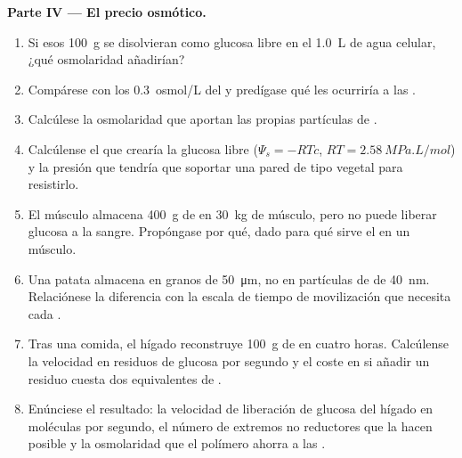 \begin{problem}
\medskip
\noindent\textbf{Parte IV --- El precio osmótico.}
\begin{enumerate}[resume]
  \item Si esos \qty{100}{g} se disolvieran como glucosa libre en el
        \qty{1.0}{L} de agua celular, ¿qué osmolaridad añadirían?
  \item Compárese con los \qty{0.3}{osmol/L} del  y predígase qué
        les ocurriría a las .
  \item Calcúlese la osmolaridad que aportan las propias partículas de
        .
  \item Calcúlense el  que crearía la glucosa libre
        ($\Psi_s = -RTc$, $RT = \qty{2.58}{MPa.L/mol}$) y la presión que
        tendría que soportar una pared de tipo vegetal para resistirlo.
  \item El músculo almacena \qty{400}{g} de  en \qty{30}{kg} de
        músculo, pero no puede liberar glucosa a la sangre. Propóngase por
        qué, dado para qué sirve el  en un músculo.
  \item Una patata almacena  en granos de \qty{50}{\micro m}, no en
        partículas de  de \qty{40}{nm}. Relaciónese la diferencia
        con la escala de tiempo de movilización que necesita cada
        .
  \item Tras una comida, el hígado reconstruye \qty{100}{g} de  en
        cuatro horas. Calcúlense la velocidad en residuos de glucosa por
        segundo y el coste en  si añadir un residuo cuesta dos
        equivalentes de .
  \item Enúnciese el resultado: la velocidad de liberación de glucosa del
        hígado en moléculas por segundo, el número de extremos no
        reductores que la hacen posible y la osmolaridad que el polímero
        ahorra a las .
\end{enumerate}
\end{problem}
